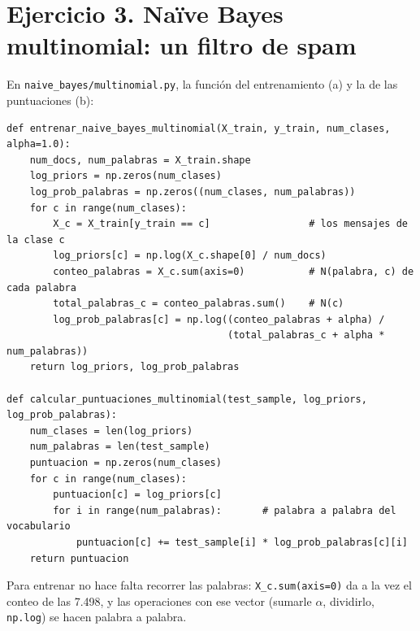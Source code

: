 \documentclass{article}
\begin{document}
\section*{Ejercicio 3. Naïve Bayes multinomial: un filtro de spam}
En \texttt{naive\_bayes/multinomial.py}, la función del entrenamiento (a) y la de las puntuaciones (b):
\begin{lstlisting}
def entrenar_naive_bayes_multinomial(X_train, y_train, num_clases, alpha=1.0):
    num_docs, num_palabras = X_train.shape
    log_priors = np.zeros(num_clases)
    log_prob_palabras = np.zeros((num_clases, num_palabras))
    for c in range(num_clases):
        X_c = X_train[y_train == c]                 # los mensajes de la clase c
        log_priors[c] = np.log(X_c.shape[0] / num_docs)
        conteo_palabras = X_c.sum(axis=0)           # N(palabra, c) de cada palabra
        total_palabras_c = conteo_palabras.sum()    # N(c)
        log_prob_palabras[c] = np.log((conteo_palabras + alpha) /
                                      (total_palabras_c + alpha * num_palabras))
    return log_priors, log_prob_palabras

def calcular_puntuaciones_multinomial(test_sample, log_priors, log_prob_palabras):
    num_clases = len(log_priors)
    num_palabras = len(test_sample)
    puntuacion = np.zeros(num_clases)
    for c in range(num_clases):
        puntuacion[c] = log_priors[c]
        for i in range(num_palabras):       # palabra a palabra del vocabulario
            puntuacion[c] += test_sample[i] * log_prob_palabras[c][i]
    return puntuacion
\end{lstlisting}
Para entrenar no hace falta recorrer las palabras: \texttt{X\_c.sum(axis=0)} da a la vez el conteo de las 7.498, y las operaciones con ese vector (sumarle $\alpha$, dividirlo, \texttt{np.log}) se hacen palabra a palabra.
\end{document}
